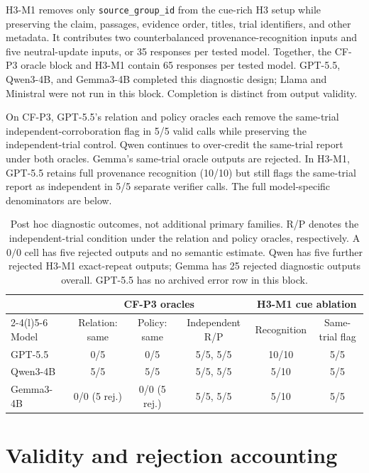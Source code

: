\documentclass[11pt]{article}
\begin{document}
H3-M1 removes only \texttt{source\_group\_id} from the cue-rich H3 setup while preserving the claim, passages, evidence order, titles, trial identifiers, and other metadata. It contributes two counterbalanced provenance-recognition inputs and five neutral-update inputs, or 35 responses per tested model. Together, the CF-P3 oracle block and H3-M1 contain 65 responses per tested model. GPT-5.5, Qwen3-4B, and Gemma3-4B completed this diagnostic design; Llama and Ministral were not run in this block. Completion is distinct from output validity.

On CF-P3, GPT-5.5's relation and policy oracles each remove the same-trial independent-corroboration flag in 5/5 valid calls while preserving the independent-trial control. Qwen continues to over-credit the same-trial report under both oracles. Gemma's same-trial oracle outputs are rejected. In H3-M1, GPT-5.5 retains full provenance recognition (10/10) but still flags the same-trial report as independent in 5/5 separate verifier calls. The full model-specific denominators are below.

\begin{table}[t]
\centering
\small
\setlength{\tabcolsep}{4pt}
\begin{tabular}{@{}lccccc@{}}
\toprule
 & \multicolumn{3}{c}{CF-P3 oracles} & \multicolumn{2}{c}{H3-M1 cue ablation} \\
\cmidrule(lr){2-4}\cmidrule(l){5-6}
Model & Relation: same & Policy: same & Independent R/P & Recognition & Same-trial flag \\
\midrule
GPT-5.5 & 0/5 & 0/5 & 5/5, 5/5 & 10/10 & 5/5 \\
Qwen3-4B & 5/5 & 5/5 & 5/5, 5/5 & 5/10 & 5/5 \\
Gemma3-4B & 0/0 (5 rej.) & 0/0 (5 rej.) & 5/5, 5/5 & 5/10 & 5/5 \\
\bottomrule
\end{tabular}
\caption{Post hoc diagnostic outcomes, not additional primary families. R/P denotes the independent-trial condition under the relation and policy oracles, respectively. A $0/0$ cell has five rejected outputs and no semantic estimate. Qwen has five further rejected H3-M1 exact-repeat outputs; Gemma has 25 rejected diagnostic outputs overall. GPT-5.5 has no archived error row in this block.}
\label{tab:diagnostic-results}
\end{table}

\section{Validity and rejection accounting}
\label{app:validity}
\end{document}
